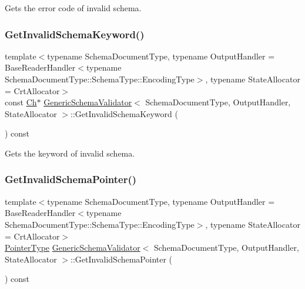 Gets the error code of invalid schema. 

\mbox{\label{classGenericSchemaValidator_ab71ec18e5a013e5153a10b312a4f03bc}} 
\subsubsection{\texorpdfstring{Get\+Invalid\+Schema\+Keyword()}{GetInvalidSchemaKeyword()}}
{\footnotesize\ttfamily template$<$typename Schema\+Document\+Type, typename Output\+Handler = Base\+Reader\+Handler$<$typename Schema\+Document\+Type\+::\+Schema\+Type\+::\+Encoding\+Type$>$, typename State\+Allocator = Crt\+Allocator$>$ \\
const \hyperlink{classGenericSchemaValidator_a8b7dab5a0cda9cc0adaefb4401d260c1}{Ch}$\ast$ \hyperlink{classGenericSchemaValidator}{Generic\+Schema\+Validator}$<$ Schema\+Document\+Type, Output\+Handler, State\+Allocator $>$\+::Get\+Invalid\+Schema\+Keyword (\begin{DoxyParamCaption}{ }\end{DoxyParamCaption}) const\hspace{0.3cm}{\ttfamily [inline]}}



Gets the keyword of invalid schema. 

\mbox{\label{classGenericSchemaValidator_a5b8f2d5c466b2a362e2e4c3bcfbfc5a8}} 
\subsubsection{\texorpdfstring{Get\+Invalid\+Schema\+Pointer()}{GetInvalidSchemaPointer()}}
{\footnotesize\ttfamily template$<$typename Schema\+Document\+Type, typename Output\+Handler = Base\+Reader\+Handler$<$typename Schema\+Document\+Type\+::\+Schema\+Type\+::\+Encoding\+Type$>$, typename State\+Allocator = Crt\+Allocator$>$ \\
\hyperlink{classGenericSchemaValidator_ae0c6c9a9c0ff6bae80e75c6705f2668b}{Pointer\+Type} \hyperlink{classGenericSchemaValidator}{Generic\+Schema\+Validator}$<$ Schema\+Document\+Type, Output\+Handler, State\+Allocator $>$\+::Get\+Invalid\+Schema\+Pointer (\begin{DoxyParamCaption}{ }\end{DoxyParamCaption}) const\hspace{0.3cm}{\ttfamily [inline]}}



